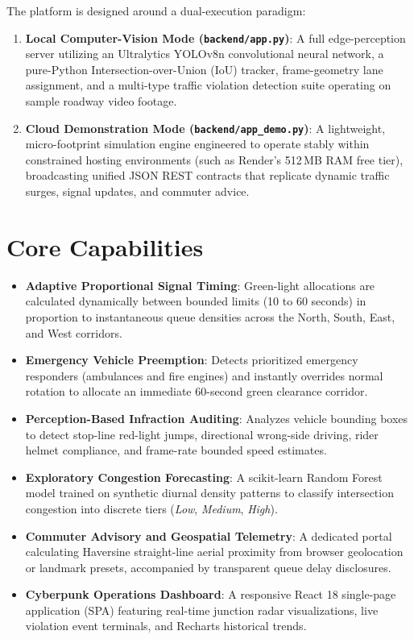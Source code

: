 \documentclass[11pt,a4paper,oneside]{report}
\begin{document}
The platform is designed around a dual-execution paradigm:
\begin{enumerate}[leftmargin=*]
    \item \textbf{Local Computer-Vision Mode (\texttt{backend/app.py})}: A full edge-perception server utilizing an Ultralytics YOLOv8n convolutional neural network, a pure-Python Intersection-over-Union (IoU) tracker, frame-geometry lane assignment, and a multi-type traffic violation detection suite operating on sample roadway video footage.
    \item \textbf{Cloud Demonstration Mode (\texttt{backend/app\_demo.py})}: A lightweight, micro-footprint simulation engine engineered to operate stably within constrained hosting environments (such as Render's 512\,MB RAM free tier), broadcasting unified JSON REST contracts that replicate dynamic traffic surges, signal updates, and commuter advice.
\end{enumerate}

\section{Core Capabilities}
\begin{itemize}[leftmargin=*]
    \item \textbf{Adaptive Proportional Signal Timing}: Green-light allocations are calculated dynamically between bounded limits (10 to 60 seconds) in proportion to instantaneous queue densities across the North, South, East, and West corridors.
    \item \textbf{Emergency Vehicle Preemption}: Detects prioritized emergency responders (ambulances and fire engines) and instantly overrides normal rotation to allocate an immediate 60-second green clearance corridor.
    \item \textbf{Perception-Based Infraction Auditing}: Analyzes vehicle bounding boxes to detect stop-line red-light jumps, directional wrong-side driving, rider helmet compliance, and frame-rate bounded speed estimates.
    \item \textbf{Exploratory Congestion Forecasting}: A scikit-learn Random Forest model trained on synthetic diurnal density patterns to classify intersection congestion into discrete tiers (\textit{Low}, \textit{Medium}, \textit{High}).
    \item \textbf{Commuter Advisory and Geospatial Telemetry}: A dedicated portal calculating Haversine straight-line aerial proximity from browser geolocation or landmark presets, accompanied by transparent queue delay disclosures.
    \item \textbf{Cyberpunk Operations Dashboard}: A responsive React 18 single-page application (SPA) featuring real-time junction radar visualizations, live violation event terminals, and Recharts historical trends.
\end{itemize}
\end{document}
